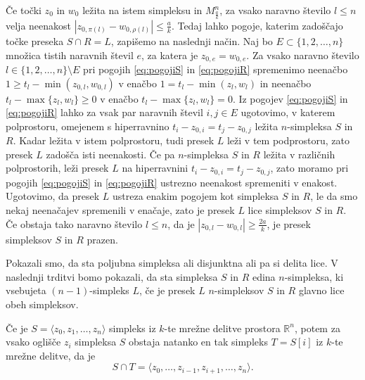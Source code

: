 \documentclass[mat1]{fmfdelo}
\newcommand{\R}{\mathbb R}
\newcommand{\0}{0}
\begin{document}
Če točki $z_0$ in $w_0$ ležita na istem simpleksu in $M_{\frac{a}{k}}^n$, za vsako naravno število $l \leq n$ velja neenakost $|z_{0, \pi(l)} - w_{0, \rho(l)}| \leq \frac{a}{k}$. Tedaj lahko pogoje, katerim zadoščajo točke preseka $S \cap R = L$, zapišemo na naslednji način. Naj bo $E \subset \{1, 2, \dots, n \}$ množica tistih naravnih števil $e$, za katera je $z_{0,e} = w_{0, e}$. Za vsako naravno število $l \in \{1, 2, \dots, n \} \setminus E$ pri pogojih \eqref{eq:pogojiS} in \eqref{eq:pogojiR} spremenimo neenačbo $1 \geq t_l - \min(z_{0, l}, w_{0, l})$ v enačbo $1 = t_l - \min(z_l, w_l)$ in neenačbo $t_l - \max \{z_l, w_l \} \geq 0$ v enačbo $t_l - \max \{z_l, w_l \} = 0$. 
Iz pogojev \eqref{eq:pogojiS} in \eqref{eq:pogojiR} lahko za vsak par naravnih števil $i, j \in E$ ugotovimo, v katerem polprostoru, omejenem s hiperravnino $t_i - z_{0, i} = t_j - z_{0, j}$ ležita $n$-simpleksa $S$ in $R$. Kadar ležita v istem polprostoru, tudi presek $L$ leži v tem podprostoru, zato presek $L$ zadošča isti neenakosti. Če pa $n$-simpleksa $S$ in $R$ ležita v različnih polprostorih, leži presek $L$ na hiperravnini $t_i - z_{0, i} = t_j - z_{0, j}$, zato moramo pri pogojih \eqref{eq:pogojiS} in \eqref{eq:pogojiR} ustrezno neenakost spremeniti v enakost. Ugotovimo, da presek $L$ ustreza enakim pogojem kot simpleksa $S$ in $R$, le da smo nekaj neenačajev spremenili v enačaje, zato je presek $L$ lice simpleksov $S$ in $R$.
Če obstaja tako naravno število $l \leq n$, da je $|z_{0, l} - w_{0, l}| \geq \frac{2a}{k}$, je presek simpleksov $S$ in $R$ prazen.

Pokazali smo, da sta poljubna simpleksa ali disjunktna ali pa si delita lice. V naslednji trditvi bomo pokazali, da sta simpleksa $S$ in $R$ edina $n$-simpleksa, ki vsebujeta $(n-1)$-simpleks $L$, če je presek $L$ $n$-simpleksov $S$ in $R$ glavno lice obeh simpleksov.
\begin{trditev}
Če je $S = \langle z_0, z_1, \dots, z_n \rangle$ simpleks iz $k$-te mrežne delitve prostora $\R^n$, potem za vsako oglišče $z_i$ simpleksa $S$ obstaja natanko en tak simpleks $T = S[i]$ iz $k$-te mrežne delitve, da je 
$$S \cap T = \langle z_0, \dots, z_{i-1}, z_{i+1}, \dots, z_n \rangle.$$
\end{trditev}
\end{document}
